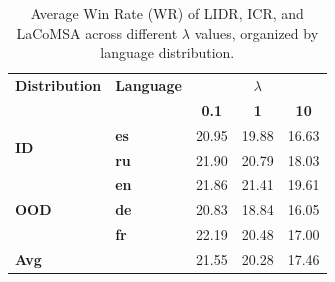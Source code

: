 \begin{table}[t]
\centering
\scriptsize
\setlength{\tabcolsep}{6pt}
\renewcommand{\arraystretch}{1.15}
\begin{tabular}{ll|ccc}
\toprule
\textbf{Distribution} & \textbf{Language} & \multicolumn{3}{c}{\textbf{$\lambda$}} \\
 &  & \textbf{0.1} & \textbf{1} & \textbf{10} \\
\midrule
\multirow{2}{*}{\textbf{ID}} & \textbf{es} & 20.95 & 19.88 & 16.63 \\
 & \textbf{ru} & 21.90 & 20.79 & 18.03 \\
\midrule
\multirow{3}{*}{\textbf{OOD}} & \textbf{en} & 21.86 & 21.41 & 19.61 \\
 & \textbf{de} & 20.83 & 18.84 & 16.05 \\
 & \textbf{fr} & 22.19 & 20.48 & 17.00 \\
\midrule
\multicolumn{2}{l|}{\textbf{Avg}} & 21.55 & 20.28 & 17.46 \\
\bottomrule
\end{tabular}
\caption{Average Win Rate (WR) of LIDR, ICR, and LaCoMSA across different $\lambda$ values, organized by language distribution.}
\label{tab:lambda_reorganized_wr}
\end{table}
